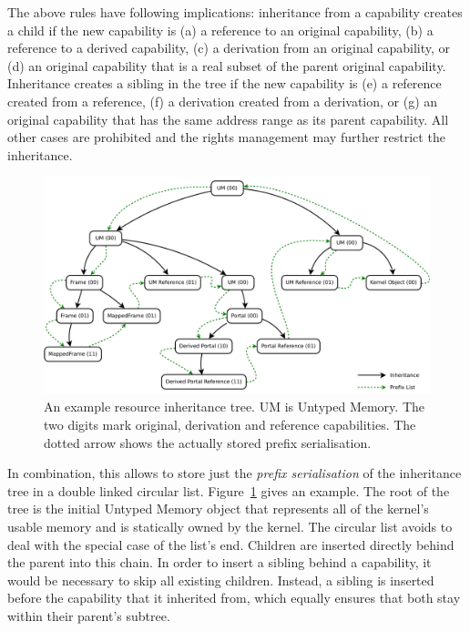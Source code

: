 The above rules have following implications: inheritance from a capability creates a child if the new capability is (a) a reference to an original capability, (b) a reference to a derived capability, (c) a derivation from an original capability, or (d) an original capability that is a real subset of the parent original capability. 
Inheritance creates a sibling in the tree if the new capability is (e) a reference created from a reference, (f) a derivation created from a derivation, or (g) an original capability that has the same address range as its parent capability.
All other cases are prohibited and the rights management may further restrict the inheritance.

\begin{figure}
  \centering
  \includegraphics[scale=0.25]{fig/cap-tree.pdf}
  \caption{An example resource inheritance tree. UM is Untyped Memory. The two digits mark original, derivation and reference capabilities. The dotted arrow shows the actually stored prefix serialisation.}
  \label{fig:kernel-object-cap}
\end{figure}

In combination, this allows to store just the \emph{prefix serialisation} of the inheritance tree in a double linked circular list. Figure~\ref{fig:kernel-object-cap} gives an example. The root of the tree is the initial Untyped Memory object that represents all of the kernel's usable memory and is statically owned by the kernel. The circular list avoids to deal with the special case of the list's end. Children are inserted directly behind the parent into this chain. In order to insert a sibling behind a capability, it would be necessary to skip all existing children. Instead, a sibling is inserted before the capability that it inherited from, which equally ensures that both stay within their parent's subtree.

